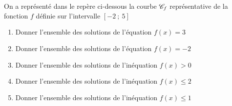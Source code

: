 \documentclass[oneside,12pt]{article}          %
\begin{document}
On a représenté dans le repère ci-dessous la courbe ${\mathscr{C}}_f$ représentative de la fonction $f$ définie sur l'intervalle $[-2 ~;~ 5]$

\begin{minipage}{0.55\linewidth}
    \begin{enumerate} 
    		\item Donner l'ensemble des solutions de l'équation $f(x) = 3$
    		\item Donner l'ensemble des solutions de l'équation $f(x) = -2$
    		\item Donner l'ensemble des solutions de l'inéquation $f(x) > 0$
    		\item Donner l'ensemble des solutions de l'inéquation $f(x) \leq 2$
    		\item Donner l'ensemble des solutions de l'inéquation $f(x) \leq 1$
    \end{enumerate}
\end{minipage}
\end{document}

